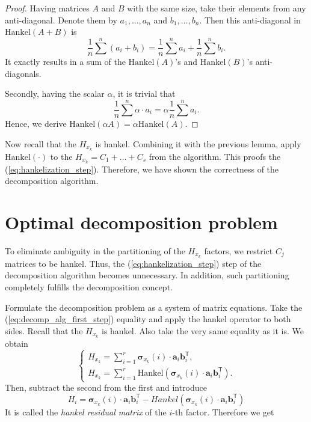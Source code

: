 \documentclass[referee, pdflatex, sn-mathphys-num]{sn-jnl}
\theoremstyle{definition}
\theoremstyle{plain}
\begin{document}
	\begin{proof}		
		Having matrices $ A $ and $ B $ with the same size, take their elements from any anti-diagonal. Denote them by $ a_1, \ldots, a_n $ and $ b_1, \ldots, b_n $. Then this anti-diagonal in $ \text{Hankel}(A + B) $ is
		\begin{equation*}
			 \dfrac{1}{n} \sum\limits^n (a_i + b_i) = \dfrac{1}{n} \sum\limits^n a_i + \dfrac{1}{n} \sum\limits^n b_i.
		\end{equation*}
		It exactly results in a sum of the $ \text{Hankel}(A) $'s and $ \text{Hankel}(B) $'s anti-diagonals.
		
		Secondly, having the scalar $ \alpha $, it is trivial that 
		\begin{equation*}
			 \dfrac{1}{n} \sum\limits^n \alpha \cdot a_i = \alpha \dfrac{1}{n} \sum\limits^n a_i.
		\end{equation*}
		Hence, we derive $ \text{Hankel}(\alpha A) = \alpha \text{Hankel}(A) $.
	\end{proof}
	
	Now recall that the $ H_{x_k} $ is hankel. Combining it with the previous lemma, apply $ \text{Hankel}(\cdot) $ to the $ H_{x_k} = C_1 + \ldots + C_s $ from the algorithm. This proofs the (\ref{eq:hankelization_step}). Therefore, we have shown the correctness of the decomposition algorithm.
	
	\section{Optimal decomposition problem}\label{sec:optimal_decomp}
	
	To eliminate ambiguity in the partitioning of the $ H_{x_k} $ factors, we restrict $ C_j $ matrices to be hankel. Thus, the (\ref{eq:hankelization_step}) step of the decomposition algorithm becomes unnecessary. In addition, such partitioning completely fulfills the decomposition concept. 
	
	Formulate the decomposition problem as a system of matrix equations. Take the (\ref{eq:decomp_alg_first_step}) equality and apply the hankel operator to both sides. Recall that the $ H_{x_k} $ is hankel. Also take the very same equality as it is. We obtain
	\begin{equation*}
		\begin{cases*}
			H_{x_k} = \sum\limits_{i = 1}^{r} \boldsymbol{\sigma}_{x_k}(i) \cdot \mathbf{a}_i  \mathbf{b}_i^{\mathsf{T}}, \\
			H_{x_k} = \sum\limits_{i = 1}^{r} \text{Hankel}(\boldsymbol{\sigma}_{x_k}(i) \cdot \mathbf{a}_i  \mathbf{b}_i^{\mathsf{T}}).
		\end{cases*}
	\end{equation*}
	Then, subtract the second from the first and introduce
	\begin{equation*}
		H_i = \boldsymbol{\sigma}_{x_k}(i) \cdot \mathbf{a}_i  \mathbf{b}_i^{\mathsf{T}} - Hankel(\boldsymbol{\sigma}_{x_k}(i) \cdot \mathbf{a}_i  \mathbf{b}_i^{\mathsf{T}})
	\end{equation*}
	It is called the \emph{hankel residual matrix} of the $ i $-th factor. Therefore we get
	
\end{document}
